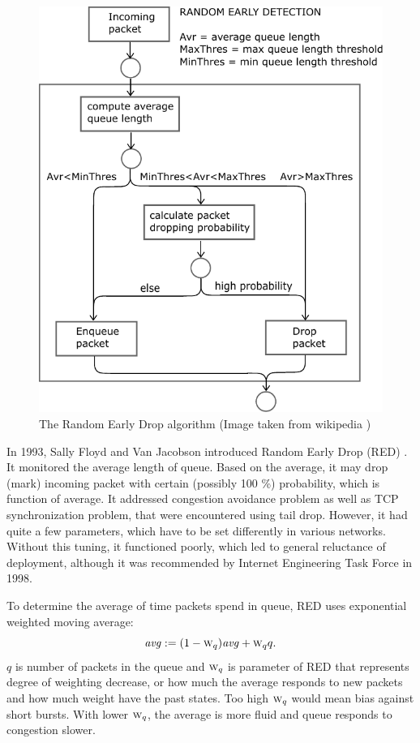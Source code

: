 \begin{figure}
	\centering
	\includegraphics[width=137mm]{drawings/RED}
	\caption{The Random Early Drop algorithm (Image taken from wikipedia \cite{RED:picture}) }
	
	\label{fig04:RED}
\end{figure}

In 1993, Sally Floyd and Van Jacobson introduced Random Early Drop (RED) \cite{Floyd:1993:RED:169931.169935}. It monitored the average length of queue. Based on the average, it may drop (mark) incoming packet with certain (possibly 100 \%) probability, which is function of average. It addressed congestion avoidance problem as well as TCP synchronization problem, that were encountered using tail drop. However, it had quite a few parameters, which have to be set differently in various networks. Without this tuning, it functioned poorly, which led to general reluctance of deployment, although it was recommended by Internet Engineering Task Force \cite{rfc2309} in 1998.

To determine the average of time packets spend in queue, RED uses exponential weighted moving average:
\[
\text{\emph{avg}} := (1 - \textsc{w}_q)\text{\emph{avg}}+\textsc{w}_qq.
\]
$q$ is number of packets in the queue and $\textsc{w}_q$ is parameter of RED that represents degree of weighting decrease, or how much the average responds to new packets and how much weight have the past states. Too high $\textsc{w}_q$ would mean bias against short bursts. With lower $\textsc{w}_q$, the average is more fluid and queue responds to congestion slower.

